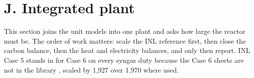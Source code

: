 \providecommand{\cChMass}{0.79}
\providecommand{\cCoolHW}{21.7}
\providecommand{\cCoolKO}{5.8}
\providecommand{\cDfSlip}{161.8}
\providecommand{\cDiceCompPct}{27}
\providecommand{\cEtaTh}{0.67}
\providecommand{\cMng}{17.18}
\providecommand{\cRlowScreen}{163.0}
\providecommand{\cVolScale}{0.6891}
\providecommand{\cWalkAb}{220.4}
\providecommand{\cWalkAc}{225.3}
\providecommand{\cWalkAd}{242.4}
\providecommand{\cWalkAe}{242.8}
\providecommand{\cWalkAf}{\vQRA}
\providecommand{\cYm}{2.21}
\providecommand{\cYv}{3.82}
\providecommand{\vAcFiveBS}{165.6}
\providecommand{\vAcFiveBT}{189{}.8}
\providecommand{\vAcFiveNeedBS}{140.8}
\providecommand{\vAcFiveNeedBT}{161.7}
\providecommand{\vCapA}{1{,}655.1}
\providecommand{\vEcomp}{4.25}
\providecommand{\vEfans}{0.77}
\providecommand{\vEpump}{0.87}
\providecommand{\vEpurge}{4.32}
\providecommand{\vEpurgeNo}{3.89}
\providecommand{\vErowCool}{0.068}
\providecommand{\vErowPsa}{0.012}
\providecommand{\vErowRef}{0.82}
\providecommand{\vErowSteam}{0.20}
\providecommand{\vErowWater}{1.02}
\providecommand{\vHkgB}{8{,}988}
\providecommand{\vImpA}{22.5}
\providecommand{\vImpB}{0.0}
\providecommand{\vNGxB}{23.23}
\providecommand{\vPlantCapRes}{0.9038}
\providecommand{\vPsaFeed}{10{,}214}
\providecommand{\vPsaRej}{1{,}226}
\providecommand{\vRahn}{204.0}
\providecommand{\vRahnHeld}{202.9}
\providecommand{\vRbest}{155.8}
\providecommand{\vRhigh}{214.9}
\providecommand{\vStackExp}{16.76}
\providecommand{\vStackSel}{12.73}
\providecommand{\vStackSyn}{7.69}
\providecommand{\vTgB}{471.7}
\providecommand{\vTgInlA}{495.6}
\providecommand{\vTubeInlA}{2{,}157.2}
\providecommand{\vWalkFive}{166.2}
\providecommand{\vWalkFour}{165.9}
\providecommand{\vWalkOne}{140.8}
\providecommand{\vWalkSix}{\vQRB}
\providecommand{\vWalkThree}{154.3}
\providecommand{\vWalkTwo}{150.6}
\providecommand{\vWalkZero}{206.0}
\section{J. Integrated plant}\label{sec:J}
This section joins the unit models into one plant and asks how large the reactor must be. The order of work matters: scale the INL reference first, then close the carbon balance, then the heat and electricity balances, and only then report. INL Case 5 stands in for Case 6 on every syngas duty because the Case 6 sheets are not in the library , scaled by 1,927 over 1,970 where used.

